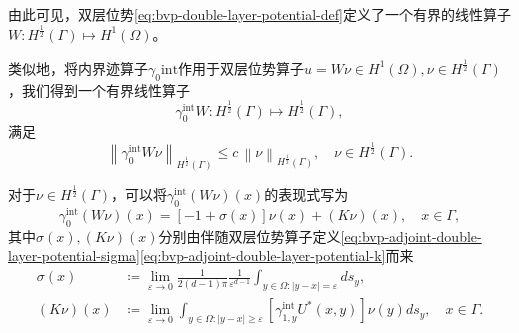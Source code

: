 由此可见，双层位势\eqref{eq:bvp-double-layer-potential-def}定义了一个有界的线性算子$W : H^{\frac{1}{2}}(\Gamma) \mapsto H^{1}(\Omega)$。

类似地，将内界迹算子$\gamma_{0}{\text{int}}$作用于双层位势算子$u = W \nu \in H^{1}(\Omega), \nu \in H^{\frac{1}{2}}(\Gamma)$，我们得到一个有界线性算子
\begin{equation*}
  \gamma_{0}^{\text{int}} W : H^{\frac{1}{2}}(\Gamma) \mapsto H^{\frac{1}{2}}(\Gamma),
\end{equation*}
满足
\begin{equation*}
  \left\| \gamma_{0}^{\text{int}} W \nu \right\|_{H^{\frac{1}{2}}(\Gamma)}
  \le c \, \left\| \nu \right\|_{H^{\frac{1}{2}}(\Gamma)}, \quad \nu \in H^{\frac{1}{2}}(\Gamma).
\end{equation*}

\begin{lemma}[双层位势的跃动关系]
  \label{lemma:bvp-double-layer-gamma0-representation-formula}
  对于$\nu \in H^{\frac{1}{2}}(\Gamma)$，可以将$\gamma_{0}^{\text{int}} \left( W \nu \right)(x)$的表现式写为
\begin{equation}
  \label{eq:bvp-double-layer-gamma0-representation-formula}
  \gamma_{0}^{\text{int}} \left( W \nu \right)(x) =
  \left[
  - 1 + \sigma(x)
  \right]
  \nu(x) + \left( K \nu \right) (x),
  \quad x \in \Gamma,
\end{equation}
其中$\sigma(x), \left(K \nu  \right) (x)$分别由伴随双层位势算子定义\eqref{eq:bvp-adjoint-double-layer-potential-sigma}\eqref{eq:bvp-adjoint-double-layer-potential-k}而来
\begin{align}
  \label{eq:bvp-double-layer-potential-sigma}
  \sigma(x) &\coloneqq
  \lim_{\varepsilon \rightarrow 0}
  \frac{1}{2(d-1) \pi}
  \frac{1}{\varepsilon^{d-1}}
  \int_{y \in \Omega: \left| y - x \right| = \varepsilon}
  d s_y, \\
  \label{eq:bvp-double-layer-potential-k}
  \left( K \nu \right) (x) & \coloneqq
  \lim_{\varepsilon \rightarrow 0}
  \int_{y \in \Omega: \left| y - x \right| \ge \varepsilon}
  \left[
  \gamma_{1,y}^{\text{int}}
  U^{*}(x,y)
  \right]
  \nu(y)
  d s_y, \quad x \in \Gamma.
\end{align}
\end{lemma}
